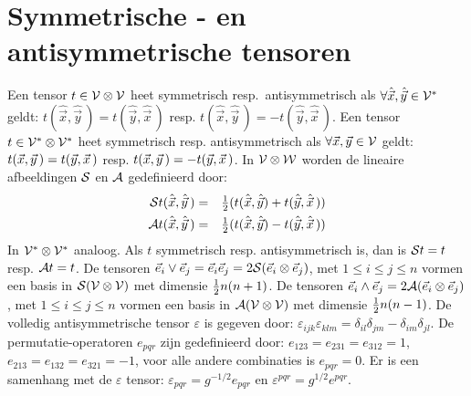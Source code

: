 \section{Symmetrische - en antisymmetrische tensoren}
Een tensor $t\in{\cal V\otimes V}$ heet symmetrisch resp.\ antisymmetrisch als
$\forall\hat{\vec{x}},\hat{\vec{y}}\in{\cal V^*}$ geldt:
$t(\hat{\vec{x}},\hat{\vec{y}}\,)=t(\hat{\vec{y}},\hat{\vec{x}}\,)$ resp.
$t(\hat{\vec{x}},\hat{\vec{y}}\,)=-t(\hat{\vec{y}},\hat{\vec{x}}\,)$.
\npar
Een tensor $t\in{\cal V^*\otimes V^*}$ heet symmetrisch resp. antisymmetrisch
als $\forall\vec{x},\vec{y}\in{\cal V}$ geldt:
$t(\vec{x},\vec{y}\,)=t(\vec{y},\vec{x}\,)$ resp.
$t(\vec{x},\vec{y}\,)=-t(\vec{y},\vec{x}\,)$. In $\cal V\otimes W$ worden de
lineaire afbeeldingen $\cal S$ en $\cal A$ gedefinieerd door:
\begin{eqnarray*}
{\cal S}t(\hat{\vec{x}},\hat{\vec{y}}\,)&=&\mbox{$\frac{1}{2}$}(t(\hat{\vec{x}},\hat{\vec{y}})+t(\hat{\vec{y}},\hat{\vec{x}}\,))\\
{\cal A}t(\hat{\vec{x}},\hat{\vec{y}}\,)&=&\mbox{$\frac{1}{2}$}(t(\hat{\vec{x}},\hat{\vec{y}})-t(\hat{\vec{y}},\hat{\vec{x}}\,))
\end{eqnarray*}
In $\cal V^*\otimes V^*$ analoog. Als $t$ symmetrisch resp. antisymmetrisch is,
dan is ${\cal S}t=t$ resp. ${\cal A}t=t$.
\npar
De tensoren $\vec{e}_i\vee\vec{e}_j=\vec{e}_i\vec{e}_j=2{\cal S}(\vec{e}_i\otimes\vec{e}_j)$,
met $1\leq i\leq j\leq n$ vormen een basis in $\cal S(V\otimes V)$ met dimensie
$\mbox{$\frac{1}{2}$} n(n+1)$.
\npar
De tensoren $\vec{e}_i\wedge\vec{e}_j=2{\cal A}(\vec{e}_i\otimes\vec{e}_j)$,
met $1\leq i\leq j\leq n$ vormen een basis in $\cal A(V\otimes V)$ met dimensie
$\mbox{$\frac{1}{2}$} n(n-1)$.
\npar
De volledig antisymmetrische tensor $\varepsilon$ is gegeven door:
$\varepsilon_{ijk}\varepsilon_{klm}=\delta_{il}\delta_{jm}-\delta_{im}\delta_{jl}$.
\npar
De permutatie-operatoren $e_{pqr}$ zijn gedefinieerd door:
$e_{123}=e_{231}=e_{312}=1$, $e_{213}=e_{132}=e_{321}=-1$, voor alle andere
combinaties is $e_{pqr}=0$. Er is een samenhang met de $\varepsilon$ tensor:
$\varepsilon_{pqr}=g^{-1/2}e_{pqr}$ en $\varepsilon^{pqr}=g^{1/2}e^{pqr}$.

